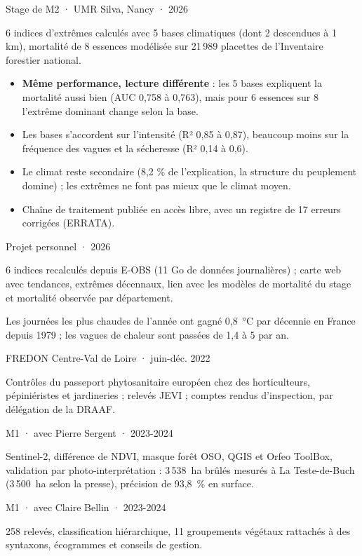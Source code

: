 \documentclass[10pt,a4paper]{article}
\newcommand{\rubrique}[1]{\needspace{7\baselineskip}\vspace{7pt}{\titre\large\bfseries\color{vert}#1}\par\vspace{-2pt}{\color{vert}\rule{\linewidth}{0.6pt}}\par\vspace{2pt}}
\newcommand{\projet}[3]{\vspace{4pt}{\bfseries #1}\hfill{\small\color{gris}#2}\par{\small\color{gris}#3}\par}
\newcommand{\cle}[1]{\colorbox{fond}{\parbox{\dimexpr\linewidth-2\fboxsep}{\small #1}}\par}
\begin{document}
\rubrique{Projets principaux}
\projet{Extrêmes climatiques et mortalité des arbres}{Stage de M2 · UMR Silva, Nancy · 2026}{6 indices d'extrêmes calculés avec 5 bases climatiques (dont 2 descendues à 1 km), mortalité de 8 essences modélisée sur 21\,989 placettes de l'Inventaire forestier national.}
\begin{itemize}
\item \textbf{Même performance, lecture différente} : les 5 bases expliquent la mortalité aussi bien (AUC 0,758 à 0,763), mais pour 6 essences sur 8 l'extrême dominant change selon la base.
\item Les bases s'accordent sur l'intensité (R² 0,85 à 0,87), beaucoup moins sur la fréquence des vagues et la sécheresse (R² 0,14 à 0,6).
\item Le climat reste secondaire (8,2 \% de l'explication, la structure du peuplement domine) ; les extrêmes ne font pas mieux que le climat moyen.
\item Chaîne de traitement publiée en accès libre, avec un registre de 17 erreurs corrigées (ERRATA).
\end{itemize}

\projet{Carte interactive des extrêmes climatiques en France, 1979-2024}{Projet personnel · 2026}{6 indices recalculés depuis E-OBS (11 Go de données journalières) ; carte web avec tendances, extrêmes décennaux, lien avec les modèles de mortalité du stage et mortalité observée par département.}
\cle{Les journées les plus chaudes de l'année ont gagné 0,8~°C par décennie en France depuis 1979 ; les vagues de chaleur sont passées de 1,4 à 5 par an.}

\projet{Technicien spécialisé : inspections phytosanitaires}{FREDON Centre-Val de Loire · juin-déc. 2022}{Contrôles du passeport phytosanitaire européen chez des horticulteurs, pépiniéristes et jardineries ; relevés JEVI ; comptes rendus d'inspection, par délégation de la DRAAF.}

\projet{Cartographie des incendies de 2022 dans les Landes}{M1 · avec Pierre Sergent · 2023-2024}{Sentinel-2, différence de NDVI, masque forêt OSO, QGIS et Orfeo ToolBox, validation par photo-interprétation : 3\,538~ha brûlés mesurés à La Teste-de-Buch (3\,500~ha selon la presse), précision de 93,8~\% en surface.}

\projet{Phytosociologie des prairies et pelouses du Loiret}{M1 · avec Claire Bellin · 2023-2024}{258 relevés, classification hiérarchique, 11 groupements végétaux rattachés à des syntaxons, écogrammes et conseils de gestion.}
\end{document}
